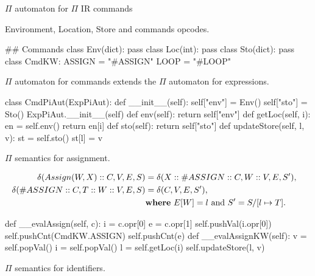 \documentclass{beamer}
\begin{document}
\begin{frame}{{\color{red}$\Pi$ automaton} for {\color{red}$\Pi$ IR} commands}

Environment, Location, Store and commands opcodes.

\begin{python}
## Commands
class Env(dict): pass
class Loc(int): pass
class Sto(dict): pass
class CmdKW:
    ASSIGN = "#ASSIGN"
    LOOP = "#LOOP"
\end{python}

\framebreak

{\color{red}$\Pi$ automaton} for commands extends the {\color{red}$\Pi$ automaton}  for expressions.

\begin{python}    
class CmdPiAut(ExpPiAut): 
    def __init__(self):    
        self["env"] = Env()
        self["sto"] = Sto()
        ExpPiAut.__init__(self)
    def env(self):
        return self["env"]
    def getLoc(self, i):
        en = self.env()
        return en[i]
    def sto(self):
        return self["sto"]
    def updateStore(self, l, v):
        st = self.sto()
        st[l] = v
\end{python}

\framebreak
        
{\color{red}$\Pi$}  semantics for assignment.

\begin{scriptsize}
\begin{align}
\delta(Assign(W, X) :: C, V, E, S) & = \delta(X :: \#ASSIGN :: C, W :: V, E, S'), \nonumber \\
\delta(\#ASSIGN :: C, T :: W :: V, E, S) & = \delta(C, V, E, S'), & \nonumber \\ & \text{\bf where}~ E[W] = l ~\text{and}~ S' = S/[l \mapsto T]. \nonumber
\end{align}
\end{scriptsize}

\begin{python}
    def __evalAssign(self, c): 
        i = c.opr[0]
        e = c.opr[1]
        self.pushVal(i.opr[0])
        self.pushCnt(CmdKW.ASSIGN)
        self.pushCnt(e)
    def __evalAssignKW(self):
        v = self.popVal()
        i = self.popVal()
        l = self.getLoc(i)
        self.updateStore(l, v) 
\end{python}

\framebreak

{\color{red}$\Pi$}  semantics for identifiers.
        

\end{frame}
\end{document}
